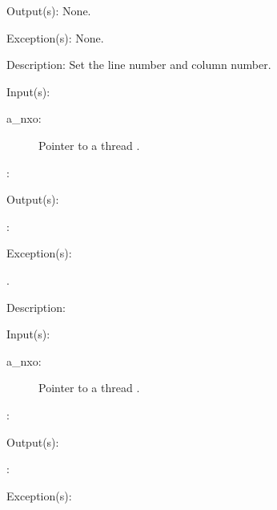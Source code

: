 \begin{capi}
\begin{capilist}
\begin{description}
		\end{description}
	\item[Output(s): ] None.
	\item[Exception(s): ] None.
	\item[Description: ]
		Set the line number and column number.
	\end{capilist}
\label{nxo_thread_}
	\begin{capilist}
	\item[Input(s): ]
		\begin{description}\item[]
		\item[a\_nxo: ]
			Pointer to a thread .
		\item[: ]
		\end{description}
	\item[Output(s): ]
		\begin{description}\item[]
		\item[: ]
		\end{description}
	\item[Exception(s): ]
		\begin{description}\item[]
		\item[.]
		\end{description}
	\item[Description: ]
	\end{capilist}
\label{nxo_thread_}
	\begin{capilist}
	\item[Input(s): ]
		\begin{description}\item[]
		\item[a\_nxo: ]
			Pointer to a thread \classname{nxo}.
		\item[: ]
		\end{description}
	\item[Output(s): ]
		\begin{description}\item[]
		\item[: ]
		\end{description}
	\item[Exception(s): ]
		\begin{description}\item[]

\end{description}
\end{capilist}
\end{capi}

